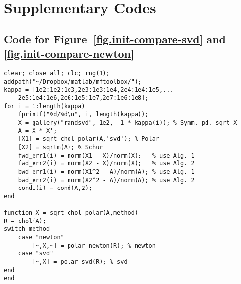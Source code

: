 \section{Supplementary Codes}

\subsection{Code for Figure~\ref{fig.init-compare-svd} and
  \ref{fig.init-compare-newton}} 
\label{app.init-compare}
\begin{lstlisting}[numbers=none]
clear; close all; clc; rng(1);
addpath("~/Dropbox/matlab/mftoolbox/");
kappa = [1e2:1e2:1e3,2e3:1e3:1e4,2e4:1e4:1e5,...
	2e5:1e4:1e6,2e6:1e5:1e7,2e7:1e6:1e8];
for i = 1:length(kappa)
	fprintf("%d/%d\n", i, length(kappa));
	X = gallery("randsvd", 1e2, -1 * kappa(i)); % Symm. pd. sqrt X
	A = X * X';
	[X1] = sqrt_chol_polar(A,'svd'); % Polar
	[X2] = sqrtm(A); % Schur
	fwd_err1(i) = norm(X1 - X)/norm(X);   % use Alg. 1
	fwd_err2(i) = norm(X2 - X)/norm(X);   % use Alg. 2
	bwd_err1(i) = norm(X1^2 - A)/norm(A); % use Alg. 1
	bwd_err2(i) = norm(X2^2 - A)/norm(A); % use Alg. 2
	condi(i) = cond(A,2);
end
    
function X = sqrt_chol_polar(A,method)
R = chol(A);
switch method
	case "newton"
		[~,X,~] = polar_newton(R); % newton
	case "svd"
		[~,X] = polar_svd(R); % svd
end
end
\end{lstlisting}



